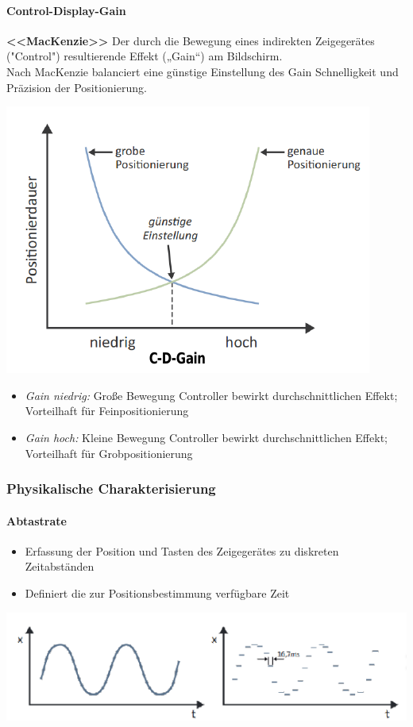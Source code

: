 \documentclass
[
	8pt,		%
	ngerman,	%
	a4paper,	%
	landscape,	%
	final		%
]{extarticle}
\begin{document}
\begin{multicols*}{4}
	\paragraph{Control-Display-Gain} \textbf{<<MacKenzie>>} Der durch die
	Bewegung eines indirekten Zeigegerätes ("Control") resultierende Effekt
	(„Gain“) am Bildschirm. \\
	Nach MacKenzie balanciert eine günstige Einstellung des Gain Schnelligkeit
	und Präzision der Positionierung.
	\begin{center}
		\includegraphics[width=0.7\linewidth]{./Documents/Graphics/ControlDisplayGain.png}
	\end{center}
	\begin{itemize}
		\item \textit{Gain niedrig:} Große Bewegung Controller bewirkt
		      durchschnittlichen Effekt; Vorteilhaft für Feinpositionierung
		\item \textit{Gain hoch:} Kleine Bewegung Controller bewirkt
		      durchschnittlichen Effekt; Vorteilhaft für Grobpositionierung
	\end{itemize}
	\subsubsection{Physikalische Charakterisierung}
	\paragraph{Abtastrate}
	\begin{itemize}
		\item Erfassung der Position und Tasten des Zeigegerätes zu diskreten
		      Zeitabständen
		\item Definiert die zur Positionsbestimmung verfügbare Zeit
	\end{itemize}
	\begin{center}
		\includegraphics[width=\linewidth]{./Documents/Graphics/SamplingRate.png}
	\end{center}

\end{multicols*}
\end{document}

